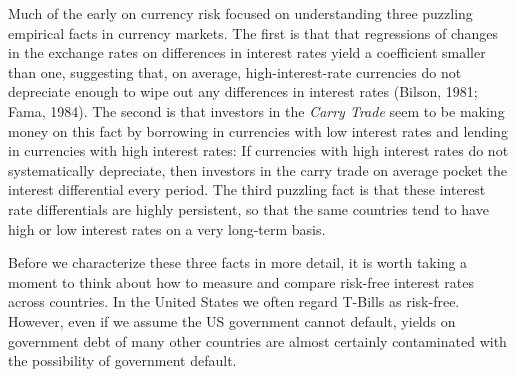 \documentclass{ar-1col}
\begin{document}
Much of the early on currency risk focused on understanding three
puzzling empirical facts in currency markets. The first is that that
regressions of changes in the exchange rates on differences in
interest rates yield a coefficient smaller than one, suggesting that,
on average, high-interest-rate currencies do not depreciate enough to
wipe out any differences in interest rates (Bilson, 1981; Fama, 1984).
The second is that investors in the \textit{Carry Trade} seem to be
making money on this fact by borrowing in currencies with low interest
rates and lending in currencies with high interest rates: If
currencies with high interest rates do not systematically depreciate,
then investors in the carry trade on average pocket the interest
differential every period. The third puzzling fact is that these
interest rate differentials are highly persistent, so that the same
countries tend to have high or low interest rates on a very long-term
basis.

Before we characterize these three facts in more detail, it is worth
taking a moment to think about how to measure and compare risk-free
interest rates across countries. In the United States we often regard
T-Bills as risk-free. However, even if we assume the US government
cannot default, yields on government debt of many other countries are
almost certainly contaminated with the possibility of government
default.
\end{document}

